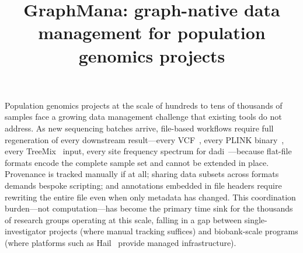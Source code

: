 \documentclass[pdflatex,sn-nature]{sn-jnl}
\begin{document}
\title[GraphMana]{GraphMana: graph-native data management for population genomics projects}

\author*[1]{ }




\maketitle


Population genomics projects at the scale of hundreds to tens of thousands of samples face a growing data management challenge that existing tools do not address. As new sequencing batches arrive, file-based workflows require full regeneration of every downstream result---every VCF~\cite{danecek2011vcf}, every PLINK binary~\cite{chang2015plink}, every TreeMix~\cite{pickrell2012treemix} input, every site frequency spectrum for dadi~\cite{gutenkunst2009dadi}---because flat-file formats encode the complete sample set and cannot be extended in place. Provenance is tracked manually if at all; sharing data subsets across formats demands bespoke scripting; and annotations embedded in file headers require rewriting the entire file even when only metadata has changed. This coordination burden---not computation---has become the primary time sink for the thousands of research groups operating at this scale, falling in a gap between single-investigator projects (where manual tracking suffices) and biobank-scale programs (where platforms such as Hail~\cite{hail} provide managed infrastructure).
\end{document}
